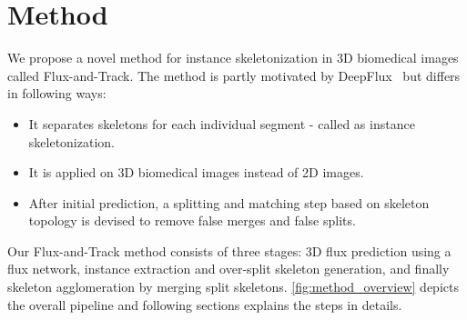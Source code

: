 
\chapter{Method}\label{chapter:method}

We propose a novel method for instance skeletonization in 3D biomedical images called Flux-and-Track. The method is partly motivated by DeepFlux~\cite{Wang2019} but differs in following ways: 
\begin{itemize}
	\item It separates skeletons for each individual segment - called as instance skeletonization.
	\item It is applied on 3D biomedical images instead of 2D images.
	\item After initial prediction, a splitting and matching step based on skeleton topology is devised to remove false merges and false splits.
\end{itemize}

Our Flux-and-Track method consists of three stages: 3D flux prediction using a
flux network, instance extraction and over-split skeleton generation, and finally
skeleton agglomeration by merging split skeletons. \autoref{fig:method_overview} depicts the overall pipeline and following sections explains the steps in details.

